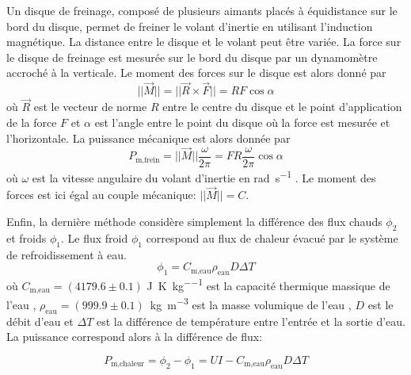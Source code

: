 Un disque de freinage, composé de plusieurs aimants placés à équidistance sur le bord du disque, permet de freiner le volant d'inertie en utilisant l'induction magnétique. La distance entre le disque et le volant peut être variée. La force sur le disque de freinage est mesurée sur le bord du disque par un dynamomètre accroché à la verticale. Le moment des forces sur le disque est alors donné par
\begin{equation}
    ||\vec{M}|| = ||\vec{R} \times \vec{F}|| = RF \cos{\alpha}
    \label{eq:couple}
\end{equation}
où \(\vec{R}\) est le vecteur de norme \(R\) entre le centre du disque et le point d'application de la force \(F\) et \(\alpha\) est l'angle entre le point du disque où la force est mesurée et l'horizontale. La puissance mécanique est alors donnée par
\begin{equation}
    P_\textrm{m,frein} = ||\vec{M}||\frac{\omega}{2 \pi} = F R \frac{\omega}{2 \pi} \cos{\alpha}
    \label{eq:pm_frein}
\end{equation}
où \(\omega\) est la vitesse angulaire du volant d'inertie en \si{\radian\per\second} \cite{chadsermet}. Le moment des forces est ici égal au couple mécanique: \(||\vec{M}|| = C\).

Enfin, la dernière méthode considère simplement la différence des flux chauds \(\phi_2\) et froids \(\phi_1\). Le flux froid \(\phi_1\) correspond au flux de chaleur évacué par le système de refroidissement à eau.
\begin{equation}
    \phi_1 = C_\textrm{m,eau} \rho_\textrm{eau} D \Delta T
\end{equation}
où \(C_\textrm{m,eau} = (4179.6 \pm 0.1)\) \si{\joule\per\kelvin\per\kilo\gram} est la capacité thermique massique de l'eau \cite{proprietes-eau}, \mbox{\(\rho_\textrm{eau} = (999.9 \pm 0.1)\) \si{\kilo\gram\per\meter\cubed}} est la masse volumique de l'eau \cite{proprietes-eau}, \(D\) est le débit d'eau et \(\Delta T\) est la différence de température entre l'entrée et la sortie d'eau. La puissance correspond alors à la différence de flux:

\begin{equation}
    P_\textrm{m,chaleur} = \phi_2 - \phi_1 = UI - C_\textrm{m,eau} \rho_\textrm{eau} D \Delta T
    \label{eq:pm_chaleur}
\end{equation}

